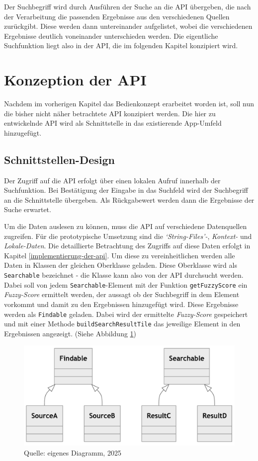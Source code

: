 \documentclass[
  12pt,
  a4paperpaper,
]{report}
\begin{document}
Der Suchbegriff wird durch Ausführen der Suche an die API übergeben, die
nach der Verarbeitung die passenden Ergebnisse aus den verschiedenen
Quellen zurückgibt. Diese werden dann untereinander aufgelistet, wobei
die verschiedenen Ergebnisse deutlich voneinander unterschieden werden.
Die eigentliche Suchfunktion liegt also in der API, die im folgenden
Kapitel konzipiert wird.

\section{Konzeption der API}\label{konzeption-der-api}

Nachdem im vorherigen Kapitel das Bedienkonzept erarbeitet worden ist,
soll nun die bisher nicht näher betrachtete API konzipiert werden. Die
hier zu entwickelnde API wird als Schnittstelle in das existierende
App-Umfeld hinzugefügt.

\subsection{Schnittstellen-Design}\label{schnittstellen-design}

Der Zugriff auf die API erfolgt über einen lokalen Aufruf innerhalb der
Suchfunktion. Bei Bestätigung der Eingabe in das Suchfeld wird der
Suchbegriff an die Schnittstelle übergeben. Als Rückgabewert werden dann
die Ergebnisse der Suche erwartet.

Um die Daten auslesen zu können, muss die API auf verschiedene
Datenquellen zugreifen. Für die prototypische Umsetzung sind die
\emph{`String-Files'-}, \emph{Kontext-} und \emph{Lokale-Daten}. Die
detaillierte Betrachtung des Zugriffs auf diese Daten erfolgt in Kapitel
\ref{implementierung-der-api}. Um diese zu vereinheitlichen werden alle
Daten in Klassen der gleichen Oberklasse geladen. Diese Oberklasse wird
als \texttt{Searchable} bezeichnet - die Klasse kann also von der API
durchsucht werden. Dabei soll von jedem \texttt{Searchable}-Element mit
der Funktion \texttt{getFuzzyScore} ein \emph{Fuzzy-Score} ermittelt
werden, der aussagt ob der Suchbegriff in dem Element vorkommt und damit
zu den Ergebnissen hinzugefügt wird. Diese Ergebnisse werden als
\texttt{Findable} geladen. Dabei wird der ermittelte \emph{Fuzzy-Score}
gespeichert und mit einer Methode \texttt{buildSearchResultTile} das
jeweilige Element in den Ergebnissen angezeigt. (Siehe Abbildung
\ref{fig:findable_searchable})

\begin{figure}
\centering
\includegraphics[width=0.5\linewidth,height=\textheight,keepaspectratio]{source/figures/Findable_Searchable.png}
\caption{Quelle: eigenes Diagramm, 2025}\label{fig:findable_searchable}
\end{figure}
\end{document}

